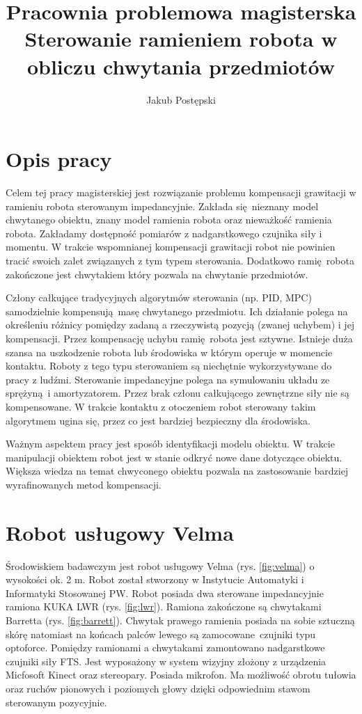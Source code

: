 \documentclass[12pt,a4paper]{article}
\begin{document}
	\title{Pracownia problemowa magisterska \\ Sterowanie ramieniem robota w obliczu chwytania przedmiotów}
	\author{Jakub Postępski}
	\maketitle


	\section{Opis pracy}
	Celem tej pracy magisterskiej jest rozwiązanie problemu kompensacji grawitacji w ramieniu robota sterowanym impedancyjnie. Zakłada się nieznany model chwytanego obiektu, znany model ramienia robota oraz nieważkość ramienia robota. Zakładamy dostępność pomiarów z nadgarstkowego czujnika siły i momentu. W trakcie wspomnianej kompensacji grawitacji robot nie powinien tracić swoich zalet związanych z tym typem sterowania. Dodatkowo ramię robota zakończone jest chwytakiem który pozwala na chwytanie przedmiotów.

	Człony całkujące tradycyjnych algorytmów sterowania (np. PID, MPC) samodzielnie kompensują masę chwytanego przedmiotu. Ich działanie polega na określeniu różnicy pomiędzy zadaną a rzeczywistą pozycją (zwanej uchybem) i jej kompensacji. Przez kompensację uchybu ramię robota jest sztywne. Istnieje duża szansa na uszkodzenie robota lub środowiska w którym operuje w momencie kontaktu. Roboty z tego typu sterowaniem są niechętnie wykorzystywane do pracy z ludźmi. Sterowanie impedancyjne\cite{impedance} polega na symulowaniu układu ze sprężyną i amortyzatorem. Przez brak członu całkującego zewnętrzne siły nie są kompensowane. W trakcie kontaktu z otoczeniem robot sterowany takim algorytmem ugina się, przez co jest bardziej bezpieczny dla środowiska.

	Ważnym aspektem pracy jest sposób identyfikacji modelu obiektu. W trakcie manipulacji obiektem robot jest w stanie odkryć nowe dane dotyczące obiektu. Większa wiedza na temat chwyconego obiektu pozwala na zastosowanie bardziej wyrafinowanych metod kompensacji.

	\section{Robot usługowy Velma}
	Środowiskiem badawczym jest robot usługowy Velma \cite{velma} (rys. \ref{fig:velma}) o wysokości ok. 2 m. Robot został stworzony w Instytucie Automatyki i Informatyki Stosowanej PW. Robot posiada dwa sterowane impedancyjnie ramiona KUKA LWR (rys. \ref{fig:lwr}). Ramiona zakończone są chwytakami Barretta (rys. \ref{fig:barrett}). Chwytak prawego ramienia posiada na sobie sztuczną skórę natomiast na końcach palców lewego są zamocowane czujniki typu optoforce. Pomiędzy ramionami a chwytakami zamontowano nadgarstkowe czujniki siły FTS. Jest wyposażony w system wizyjny złożony z urządzenia Micfosoft Kinect oraz stereopary. Posiada mikrofon. Ma możliwość obrotu tułowia oraz ruchów pionowych i poziomych głowy dzięki odpowiednim stawom sterowanym pozycyjnie.
\end{document}
